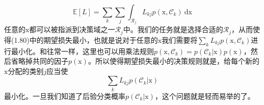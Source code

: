 \documentclass[b5paper]{book}
\numberwithin{equation}{chapter}
\begin{document}
{\begin{equation}
		\mathbb{E}[L]=\sum_k \sum_j \int_{\mathcal{R}_j}L_{kj}p(\boldsymbol{\mathrm{x}},\mathcal{C}_k)\ \mathrm{d}\boldsymbol{\mathrm{x}}
	\end{equation}
	任意的$\boldsymbol{\mathrm{x}}$都可以被指派到决策域之一$\mathcal{R}_j$中。我们的任务就是选择合适的$\mathcal{R}_j$，从而使得(1.80)中的期望损失最小，也就是说对于任意的$\boldsymbol{\mathrm{x}}$我们需要将$\sum_k L_{kj}p(\boldsymbol{\mathrm{x}},\mathcal{C}_k)$进行最小化。和往常一样，这里也可以用乘法规则$p(\boldsymbol{\mathrm{x}},\mathcal{C}_k)=p(\mathcal{C}_k|\boldsymbol{\mathrm{x}})p(\boldsymbol{\mathrm{x}})$，然后省略掉共同的因子$p(\boldsymbol{\mathrm{x}})$。所以使得期望损失最小的决策规则就是，给每个新的$\boldsymbol{\mathrm{x}}$分配的类别$j$应当使
	\begin{equation}
		\sum_k L_{kj}p(\mathcal{C}_k|\boldsymbol{\mathrm{x}})
	\end{equation}
	最小化。一旦我们知道了后验分类概率$p(\mathcal{C}_k|\boldsymbol{\mathrm{x}})$，这个问题就是轻而易举的了。
	}
\end{document}
